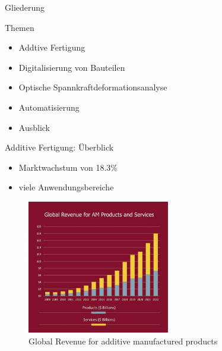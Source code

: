\documentclass[../slides.tex]{subfiles}
\begin{document}
\begin{frame}{Gliederung}
    \begin{block}{Themen}
        \begin{itemize}
            \item Addtive Fertigung
            \item Digitalisierung von Bauteilen
            \item Optische Spannkraftdeformationsanalyse
            \item Automatisierung 
            \item Ausblick
        \end{itemize}
      \end{block}
\end{frame}

\begin{frame}{Additive Fertigung: Überblick}
  \begin{minipage}[t]{.40\textwidth}
    \begin{itemize}[]
      \item Marktwachstum von 18.3\%
      \item viele Anwendungsbereiche
    \end{itemize}  
  \end{minipage}
  \hfill
  \begin{minipage}[t]{.59\textwidth}
    \begin{figure}[]
      \includegraphics[height=165pt]{img_niklas/Picture3-1-scaled_0FB63A00-D319-40EF-A648-9739A68215D6.jpg}
      \caption[short]{Global Revenue for additive manufactured products}
    \end{figure}
  \end{minipage}
\end{frame}
\end{document}
